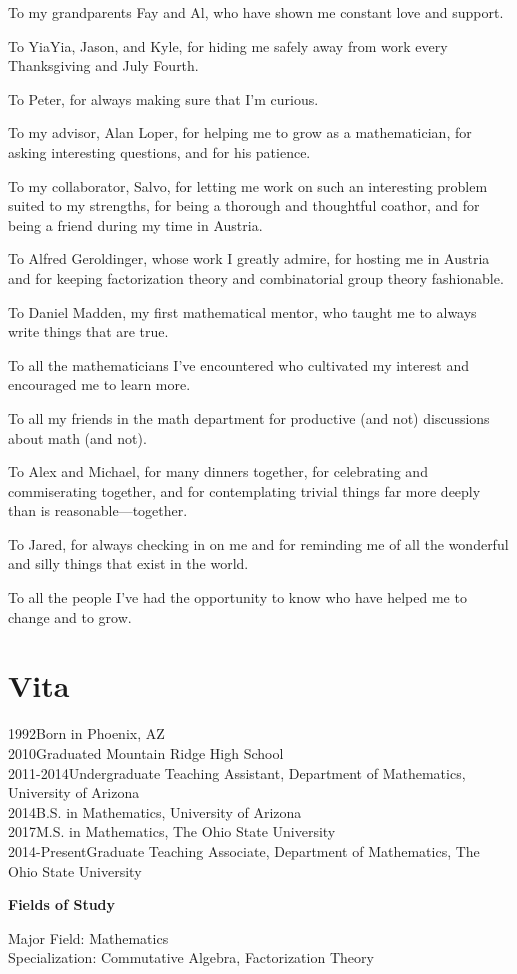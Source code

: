 To my grandparents Fay and Al, who have shown me constant love and support.

To YiaYia, Jason, and Kyle, for hiding me safely away from work every Thanksgiving and July Fourth.

To Peter, for always making sure that I'm curious.

To my advisor, Alan Loper, for helping me to grow as a mathematician, for asking interesting questions, and for his patience.

To my collaborator, Salvo, for letting me work on such an interesting problem suited to my strengths, for being a thorough and thoughtful coathor, and for being a friend during my time in Austria.

To Alfred Geroldinger, whose work I greatly admire, for hosting me in Austria and for keeping factorization theory and combinatorial group theory fashionable.

To Daniel Madden, my first mathematical mentor, who taught me to always write things that are true.

To all the mathematicians I've encountered who cultivated my interest and encouraged me to learn more.

To all my friends in the math department for productive (and not) discussions about math (and not).

To Alex and Michael, for many dinners together, for celebrating and commiserating together, and for contemplating trivial things far more deeply than is reasonable---together.

To Jared, for always checking in on me and for reminding me of all the wonderful and silly things that exist in the world.

To all the people I've had the opportunity to know who have helped me to change and to grow.






\chapter{Vita}
1992\dotfill  Born in Phoenix, AZ \\
2010\dotfill Graduated Mountain Ridge High School \\
2011-2014\dotfill Undergraduate Teaching Assistant, Department of Mathematics, University of Arizona  \\
2014\dotfill B.S. in Mathematics, University of Arizona \\
2017\dotfill M.S. in Mathematics, The Ohio State University \\
2014-Present\dotfill Graduate Teaching Associate, Department of Mathematics, The Ohio State University \\

\begin{center}
{ \LARGE \bf Fields of Study}
\end{center}
Major Field: Mathematics\\
Specialization: Commutative Algebra, Factorization Theory
